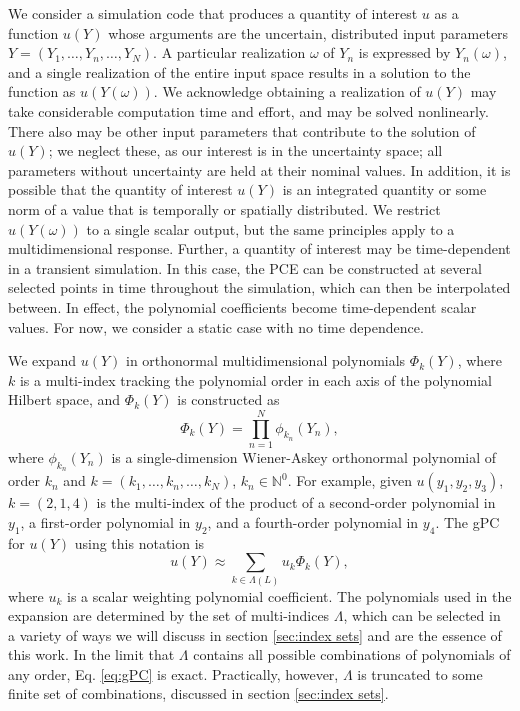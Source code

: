 We consider a simulation code that produces a quantity of interest $u$ as a function $u(Y)$ whose arguments are
the uncertain, distributed input
parameters $Y=(Y_1,\ldots,Y_n,\ldots,Y_N)$.  A particular realization $\omega$ of $Y_n$ is expressed by
$Y_n(\omega)$, and a single realization of the entire input space results in a solution to the function as
$u(Y(\omega))$.  We acknowledge obtaining a realization of $u(Y)$ may take considerable computation time and
effort, and may be solved nonlinearly.  There also may be other input parameters that
contribute to the solution of $u(Y)$; we neglect these, as our interest is in the uncertainty space; all
parameters without uncertainty are held at their nominal values.
In addition, it is possible that the quantity of interest $u(Y)$ is an integrated quantity or some norm of a
value that is temporally or spatially distributed. We restrict $u(Y(\omega))$ to a single scalar
output, but the same principles apply to a multidimensional response.  Further, a quantity of interest may be
time-dependent in a transient simulation.  In this case, the PCE can be constructed at several selected points
in time throughout the simulation, which can then be interpolated between.  In effect, the polynomial
coefficients become time-dependent scalar values.  For now, we consider a static case with no time dependence.

We expand $u(Y)$ in orthonormal multidimensional polynomials $\Phi_k(Y)$, where $k$ is a multi-index tracking
the polynomial order in each axis of the polynomial Hilbert space, and $\Phi_k(Y)$ is constructed as
\begin{equation}\label{eq:gPC}
  \Phi_k(Y) = \prod_{n=1}^N \phi_{k_n}(Y_n),
\end{equation}
where $\phi_{k_n}(Y_n)$ is a single-dimension Wiener-Askey orthonormal polynomial of order $k_n$ and
$k=(k_1,\ldots,k_n,\ldots,k_N)$, $k_n\in\mathbb{N}^0$.  For example, given $u(y_1,y_2,y_3)$, $k=(2,1,4)$
is the multi-index of the
product of a second-order polynomial in $y_1$, a first-order polynomial in $y_2$, and a fourth-order
polynomial in $y_4$. The gPC for $u(Y)$ using this notation is
\begin{equation}
  u(Y) \approx \sum_{k\in\Lambda(L)} u_k\Phi_k(Y),
\end{equation}
where $u_k$ is a scalar weighting polynomial coefficient. The polynomials used in the expansion are determined
by the set of multi-indices $\Lambda$, which can be selected in a variety of ways we will discuss in section
\ref{sec:index sets} and are the essence of this work.  In the limit
that $\Lambda$ contains all possible combinations of polynomials of any order, Eq. \ref{eq:gPC} is exact.
Practically, however, $\Lambda$ is truncated to some finite set of combinations, discussed in section
\ref{sec:index sets}.

